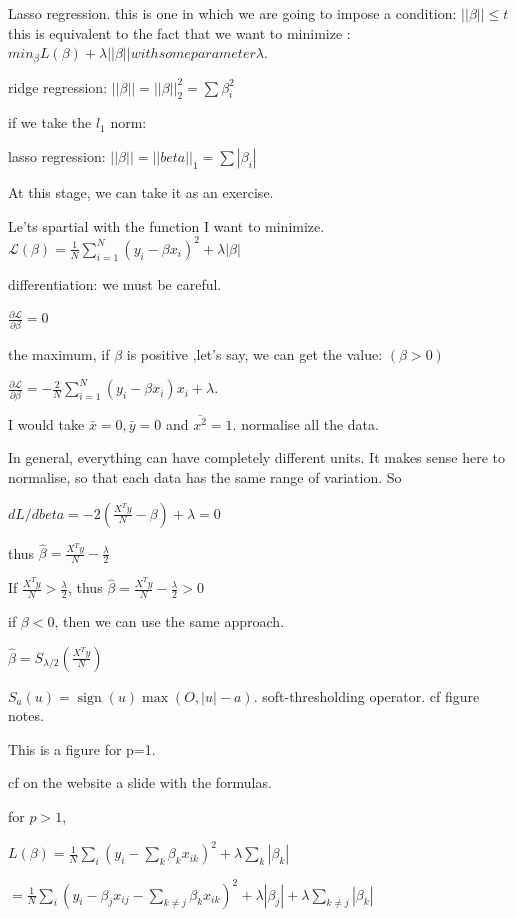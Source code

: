 \documentclass[a4paper]{tufte-book}
\DeclareMathOperator{\sign}{sign}
\begin{document}
Lasso regression.
this is one in which we are going to impose a condition:
$||\beta|| \leq t$
this is equivalent to the fact that we want to minimize :
$min_\beta L(\beta) + \lambda ||\beta|| with some parameter \lambda.$

ridge regression: $||\beta|| = ||\beta||_2^2
= \sum \beta_i^2$

if we take the $l_1$ norm:

lasso regression: $||\beta|| = ||beta||_1 = \sum |\beta_i|$

At this stage, we can take it as an exercise.

Le'ts spartial with the function I want to minimize.
$\mathcal{L} (\beta) = \frac{1}{N} \sum_{i=1}^N (y_i - \beta x_i)^2 + \lambda |\beta|$

differentiation: we must be careful.

$\frac{\partial\mathcal{L}}{\partial\beta} = 0$

the maximum, if $\beta$ is positive ,let's say, we can get the value:
$(\beta >0)$

$\frac{\partial\mathcal{L}}{\partial\beta} = - \frac{2}{N} \sum_{i=1}^N (y_i - \beta x_i)x_i + \lambda.$

I would take $\bar{x} =0, \bar{y} = 0$ and $\overline{x^2} = 1$. normalise all the
data.

In general, everything can have completely different units. It makes sense here
to normalise, so that each data has the same range of variation.
So

$dL/d beta = -2 (\frac{X^T y}{N} - \beta) + \lambda = 0$

thus $\hat \beta = \frac{X^Ty}{N}- \frac{\lambda}{2}$

If $\frac{X^Ty}{N} > \frac{\lambda}{2}$, thus
$\hat{\beta} = \frac{X^Ty}{N} - \frac{\lambda}{2} >0$

if $\beta < 0$, then we can use the same approach.

$\hat \beta= S_{\lambda/2} \left( \frac{X^T y}{N} \right)$

$S_a (u) = \sign(u) \max(O,|u|-a)$. soft-thresholding operator. cf figure notes.

This is a figure for p=1.

cf on the website a slide with the formulas.

for $p>1$,

$L(\beta) = \frac{1}{N} \sum_i (y_i - \sum_k \beta_k x_{ik} )^2 + \lambda \sum_k |\beta_k|$

$= \frac{1}{N} \sum_i (y_i - \beta_j x_{ij} - \sum_{k\neq j} \beta_k x_{ik} )^2 + \lambda |\beta_j| + \lambda \sum_{k\neq j} |\beta_k|$
\end{document}
